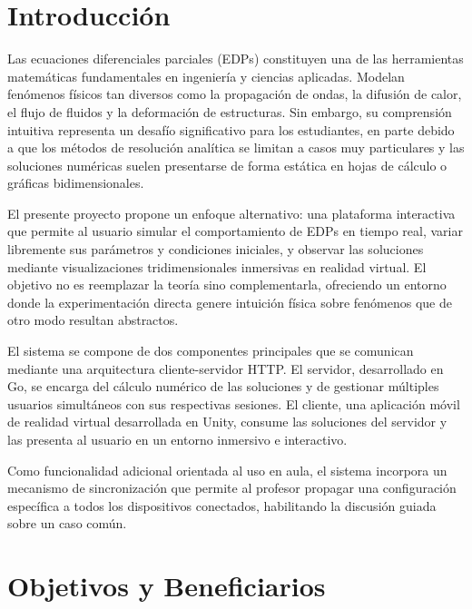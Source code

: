 \documentclass[12pt, a4paper]{article}
\begin{document}
\vfill

\newpage

\section{Introducción}

Las ecuaciones diferenciales parciales (EDPs) constituyen una de las herramientas
matemáticas fundamentales en ingeniería y ciencias aplicadas. Modelan fenómenos
físicos tan diversos como la propagación de ondas, la difusión de calor, el flujo de
fluidos y la deformación de estructuras. Sin embargo, su comprensión intuitiva
representa un desafío significativo para los estudiantes, en parte debido a que los
métodos de resolución analítica se limitan a casos muy particulares y las soluciones
numéricas suelen presentarse de forma estática en hojas de cálculo o gráficas
bidimensionales.

El presente proyecto propone un enfoque alternativo: una plataforma interactiva que
permite al usuario simular el comportamiento de EDPs en tiempo real, variar libremente
sus parámetros y condiciones iniciales, y observar las soluciones mediante
visualizaciones tridimensionales inmersivas en realidad virtual. El objetivo no es
reemplazar la teoría sino complementarla, ofreciendo un entorno donde la experimentación
directa genere intuición física sobre fenómenos que de otro modo resultan abstractos.

El sistema se compone de dos componentes principales que se comunican mediante una
arquitectura cliente-servidor HTTP. El servidor, desarrollado en Go, se encarga del
cálculo numérico de las soluciones y de gestionar múltiples usuarios simultáneos con
sus respectivas sesiones. El cliente, una aplicación móvil de realidad virtual
desarrollada en Unity, consume las soluciones del servidor y las presenta al usuario en
un entorno inmersivo e interactivo.

Como funcionalidad adicional orientada al uso en aula, el sistema incorpora un
mecanismo de sincronización que permite al profesor propagar una configuración
específica a todos los dispositivos conectados, habilitando la discusión guiada sobre
un caso común.

\newpage

\section{Objetivos y Beneficiarios}
\end{document}
